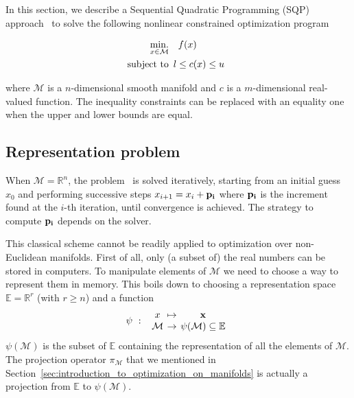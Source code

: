 In this section, we describe a Sequential Quadratic Programming (SQP) approach~\cite{nocedal:book:2006} to solve the following nonlinear constrained optimization program

\begin{align}
\label{eq:optim_problem}
  \operatorname*{min.}_{x \in \mathcal{M}} & \quad f(x)\\
  \text{subject to}&
  \begin{array}{lr}
    l \leq c(x) \leq u \nonumber
  \end{array}
\end{align}

where $\mathcal{M}$ is a $n$-dimensional smooth manifold and $c$ is a $m$-dimensional real-valued function.
The inequality constraints can be replaced with an equality one when the upper and lower bounds are equal.

\subsection{Representation problem}
When $\mathcal{M} = \mathbb{R}^n$, the problem~ is solved iteratively, starting from an initial guess $x_0$ and performing successive steps $x_{i+1} = x_i + {\bf p_i}$ where ${\bf p_i}$ is the increment found at the $i$-th iteration, until convergence is achieved.
The strategy to compute ${\bf p_i}$ depends on the solver.

This classical scheme cannot be readily applied to optimization over non-Euclidean manifolds.
First of all, only (a subset of) the real numbers can be stored in computers.
To manipulate elements of $\mathcal{M}$ we need to choose a way to represent them in memory.
This boils down to choosing a representation space $\mathbb{E} = \mathbb{R}^r$ (with $r \geq n$) and a function
\begin{equation}
  \psi\ :\
  \begin{array}{ccc}
    x & \reduce{\mapsto}{6} & \mathbf{x} \\
    \mathcal{M} & \reduce{\rightarrow}{6} & \psi(\mathcal{M}) \subseteq \mathbb{E}
  \end{array}\nonumber%
\end{equation}
$\psi(\mathcal{M})$ is the subset of $\mathbb{E}$ containing the representation of all the elements of $\mathcal{M}$.
The projection operator $\pi_\mathcal{M}$ that we mentioned in Section~\ref{sec:introduction_to_optimization_on_manifolds} is actually a projection from $\mathbb{E}$ to $\psi(\mathcal{M})$.

